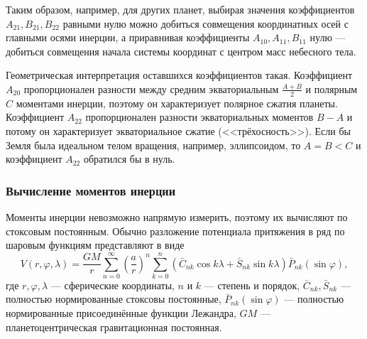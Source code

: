 \documentclass[11pt, a4paper,addpoints]{exam}
\theoremstyle{remark}
\renewcommand{\phi}{\ensuremath{\varphi}}
\begin{document}
    Таким образом, например, для других планет, выбирая значения коэффициентов $A_{21}, B_{21},
    B_{22}$ равными нулю можно добиться совмещения координатных осей с главными осями инерции, а
    приравнивая коэффициенты $A_{10}, A_{11}, B_{11}$ нулю --- добиться совмещения начала системы координат с
    центром масс небесного тела.

    Геометрическая интерпретация оставшихся коэффициентов такая. Коэффициент $A_{20}$ пропорционален
    разности между средним экваториальным $\frac{A+B}{2}$ и полярным
    $C$ моментами инерции, поэтому он характеризует полярное сжатия планеты. Коэффициент
    $A_{22}$ пропорционален разности экваториальных моментов $B-A$ и потому он характеризует
    экваториальное сжатие (<<трёхосность>>). Если бы Земля была идеальном телом вращения, например, 
    эллипсоидом, то $A = B < C$ и коэффициент $A_{22}$ обратился бы в нуль.

    \subsubsection*{Вычисление моментов инерции}
    Моменты инерции невозможно напрямую измерить, поэтому их вычисляют по стоксовым
    постоянным. Обычно разложение потенциала притяжения в ряд по шаровым функциям представляют в виде
    \begin{equation}
        V \left( r, \phi, \lambda \right) = \dfrac{GM}{r}   
            \sum\limits_{n=0}^{\infty} \left( \dfrac{a}{r} \right)^n
        \sum\limits_{k=0}^{n} \left(  
        \bar{C}_{nk}\cos{k\lambda} + \bar{S}_{nk}\sin{k\lambda}
        \right) \bar{P}_{nk} \left( \sin{\phi} \right),
    \end{equation}
    где $r, \phi, \lambda$ --- сферические координаты, $n$ и $k$ --- степень и порядок,
    $\bar{C}_{nk},\bar{S}_{nk}$ --- полностью нормированные стоксовы постоянные, 
    $\bar{P}_{nk}\left( \sin{\phi} \right)$ --- полностью нормированные присоединённые функции
    Лежандра, $GM$ --- планетоцентрическая гравитационная постоянная.
\end{document}
